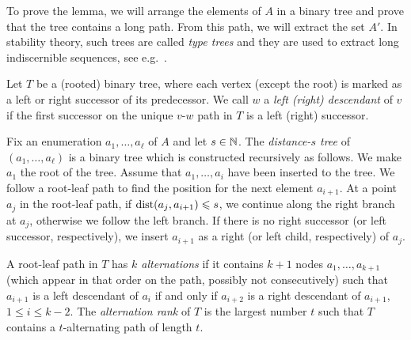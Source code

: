 
To prove the lemma, we will arrange the elements of $A$ in a binary tree
and prove that the tree contains a long path. From this path, we will 
extract the set $A'$. In stability theory, such trees are called \emph{type trees} and they are used to extract long indiscernible sequences, see e.g.~\cite{malliaris2014regularity}. 

Let $T$ be a (rooted) binary tree, where each vertex (except the root) is 
marked as a left or right successor of its predecessor. We call $w$ 
a \emph{left (right) descendant} of $v$ if the first successor on the unique
$v$-$w$ path in $T$ is a left (right) successor.

Fix an enumeration $a_1,\ldots, a_{\ell}$ of $A$ and let $s\in \mathbb{N}$. 
The \emph{distance-$s$ tree}
of $(a_1,\ldots,a_{\ell})$ is a binary tree which is constructed recursively as 
follows. We make $a_1$ the root of the tree. Assume that $a_1,\ldots, a_i$
have been inserted to the tree. We follow a root-leaf path to find the
position for the next element $a_{i+1}$. At a point $a_j$ in the root-leaf path, 
if $\mathrm{dist}(a_j,a_{i+1})\leqslant s$, we continue along the right branch at $a_j$, otherwise we follow the left branch. If 
there is no right successor (or left successor, respectively), we insert $a_{i+1}$ 
as a right (or left child, respectively) of $a_j$. 

A root-leaf path in $T$ has \emph{$k$ alternations} 
if it contains $k+1$ nodes $a_1,\ldots, a_{k+1}$ (which appear
in that order on the path, possibly not consecutively) such that $a_{i+1}$ is a left descendant of $a_i$
if and only if $a_{i+2}$ is a right descendant of $a_{i+1}$, $1\leq i\leq k-2$. 
The \emph{alternation rank} of $T$ is the largest number $t$ such that 
$T$ contains a $t$-alternating path of length $t$.

